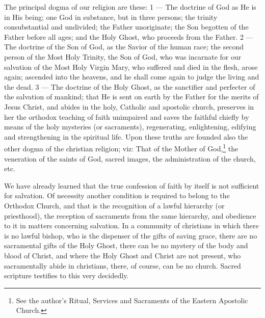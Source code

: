 The principal dogma of our religion are these: 
1 — The doctrine of God as He is in His being; 
one God in substance, but in three persons; the 
trinity consubstantial and undivided; the Father 
unoriginate; the Son begotten of the Father before
all ages; and the Holy Ghost, who proceeds 
from the Father. 2 — The doctrine of the Son 
of God, as the Savior of the human race; the 
second person of the Most Holy Trinity, the Son 
of God, who was incarnate for our salvation of 
the Most Holy Virgin Mary, who suffered and 
died in the flesh, arose again; ascended into the 
heavens, and he shall come again to judge the 
living and the dead. 3 — The doctrine of the 
Holy Ghost, as the sanctifier and perfecter of 
the salvation of mankind; that He is sent on 
earth by the Father for the merits of Jesus 
Christ, and abides in the holy, Catholic and 
apostolic church, preserves in her the orthodox 
teaching of faith unimpaired and saves the faithful
chiefly by means of the holy mysteries (or 
sacraments), regenerating, enlightening, edifying
and strengthening in the spiritual life. 
Upon these truths are founded also the other 
dogma of the christian religion; viz: That of 
the Mother of God,\footnote{See the author's Ritual,
Services and Sacraments of the Eastern Apostolic
Church.} the veneration of the saints of God,
sacred images, the administration of the church, etc. 

We have already learned that the true confession
of faith by itself is not sufficient for 
salvation. Of necessity another condition is 
required to belong to the Orthodox Church, and 
that is the recognition of a lawful hierarchy 
(or priesthood), the reception of sacraments 
from the same hierarchy, and obedience to it in 
matters concerning salvation. In a community
of christians in which there is no lawful bishop,
who is the dispenser of the gifts of saving grace,
there are no sacramental gifts of the 
Holy Ghost, there can be no mystery of the body 
and blood of Christ, and where the Holy Ghost 
and Christ are not present, who sacramentally 
abide in christians, there, of course, can be no 
church. Sacred scripture testifies to this very 
decidedly. 

